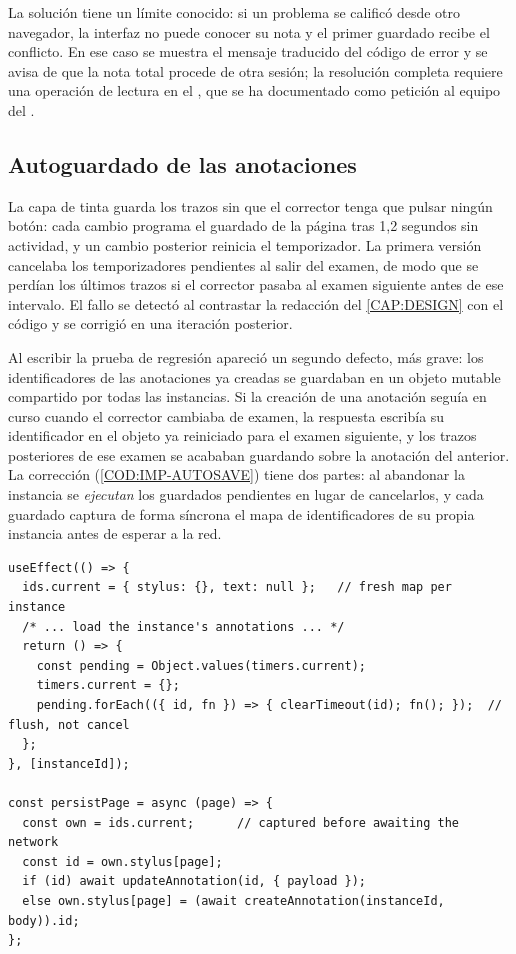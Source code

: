La solución tiene un límite conocido: si un problema se calificó desde otro navegador, la
interfaz no puede conocer su nota y el primer guardado recibe el conflicto. En ese caso se
muestra el mensaje traducido del código de error y se avisa de que la nota total procede de
otra sesión; la resolución completa requiere una operación de lectura en el
, que se ha documentado como petición al equipo del .

\subsection{Autoguardado de las anotaciones}

La capa de tinta guarda los trazos sin que el corrector tenga que pulsar ningún botón: cada
cambio programa el guardado de la página tras 1,2 segundos sin actividad, y un cambio
posterior reinicia el temporizador. La primera versión cancelaba los temporizadores
pendientes al salir del examen, de modo que se perdían los últimos trazos si el corrector
pasaba al examen siguiente antes de ese intervalo. El fallo se detectó al contrastar la
redacción del \cref{CAP:DESIGN} con el código y se corrigió en una iteración posterior.

Al escribir la prueba de regresión apareció un segundo defecto, más grave: los
identificadores de las anotaciones ya creadas se guardaban en un objeto mutable compartido
por todas las instancias. Si la creación de una anotación seguía en curso cuando el
corrector cambiaba de examen, la respuesta escribía su identificador en el objeto ya
reiniciado para el examen siguiente, y los trazos posteriores de ese examen se acababan
guardando sobre la anotación del anterior. La corrección (\cref{COD:IMP-AUTOSAVE}) tiene dos
partes: al abandonar la instancia se \emph{ejecutan} los guardados pendientes en lugar de
cancelarlos, y cada guardado captura de forma síncrona el mapa de identificadores de su
propia instancia antes de esperar a la red.

\begin{lstlisting}[caption={Guardados pendientes al salir de un examen
  (\texttt{features/grading/useAnnotations.js}).},label={COD:IMP-AUTOSAVE}]
useEffect(() => {
  ids.current = { stylus: {}, text: null };   // fresh map per instance
  /* ... load the instance's annotations ... */
  return () => {
    const pending = Object.values(timers.current);
    timers.current = {};
    pending.forEach(({ id, fn }) => { clearTimeout(id); fn(); });  // flush, not cancel
  };
}, [instanceId]);

const persistPage = async (page) => {
  const own = ids.current;      // captured before awaiting the network
  const id = own.stylus[page];
  if (id) await updateAnnotation(id, { payload });
  else own.stylus[page] = (await createAnnotation(instanceId, body)).id;
};
\end{lstlisting}

